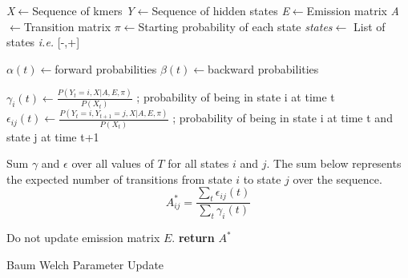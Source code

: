 \begin{algorithm}[H]
\DontPrintSemicolon
{}
\SetAlgoLined
\emph{X}$\leftarrow$Sequence of kmers\;
\emph{Y}$\leftarrow$Sequence of hidden states\;
\emph{E}$\leftarrow$Emission matrix\;
\emph{A}$\leftarrow$Transition matrix\;
\emph{$\pi$}$\leftarrow$Starting probability of each state\;
\emph{states}$\leftarrow$ List of states \emph{i.e.} [-,+]\;
\;

$\alpha(t)\leftarrow$forward probabilities\;
$\beta(t)\leftarrow$backward probabilities\;\;

$\gamma_{i}(t)\leftarrow \frac{P(Y_t=i,X|A,E,\pi)}{P(X_t)}$ ; probability of being in state i at time t\;
$\epsilon_{ij}(t)\leftarrow \frac{P(Y_t=i,Y_{t+1}=j,X|A,E,\pi)}{P(X_t)}$ ; probability of being in state i at time t and state j at time t+1\;
\;


Sum $\gamma$ and $\epsilon$ over all values of $T$ for all states $i$ and $j$. The sum below represents the expected number of transitions from state $i$ to state $j$ over the sequence. 
$$A^*_{ij} = \frac{\sum_t{\epsilon_{ij}(t)}}{\sum_t{\gamma_{i}(t)}} $$\;

Do not update emission matrix $E$.\;\;
\textbf{return} $A^*$\;

 \caption{Baum Welch Parameter Update}
 \label{alg:bw}
\end{algorithm}

\clearpage

